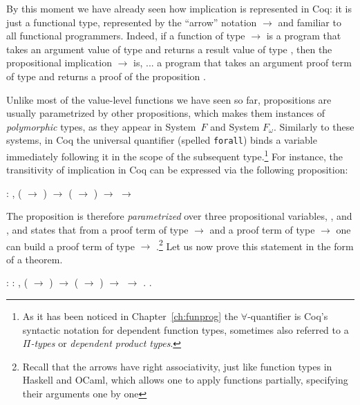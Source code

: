 By this moment we have already seen how implication is represented in
Coq: it is just a functional type, represented by the ``arrow'' notation
\ensuremath{\rightarrow} and familiar to all functional programmers. Indeed, if a function
of type  \ensuremath{\rightarrow}  is a program that takes an argument value of type 
and returns a result value of type , then the propositional
implication  \ensuremath{\rightarrow}  is, ... a program that takes an argument proof
term of type  and returns a proof of the proposition .


Unlike most of the value-level functions we have seen so far,
propositions are usually parametrized by other propositions, which
makes them instances of \textit{polymorphic} types, as they appear in
System~$F$ and System $F_{\omega}$. Similarly to these systems, in
Coq the universal quantifier \coqdockw{\ensuremath{\forall}} (spelled \texttt{forall}) binds a
variable immediately following it in the scope of the subsequent
type.\footnote{As it has been noticed in Chapter~\ref{ch:funprog} the
$\forall$-quantifier is Coq's syntactic notation for dependent
function types, sometimes also referred to a \emph{$\Pi$-types} or
\emph{dependent product types}.} For
instance, the transitivity of implication in Coq can be expressed via
the following proposition:


\begin{center}
\coqdockw{\ensuremath{\forall}}   : , ( \ensuremath{\rightarrow} ) \ensuremath{\rightarrow} ( \ensuremath{\rightarrow} ) \ensuremath{\rightarrow}  \ensuremath{\rightarrow} 
\end{center}


The proposition is therefore \textit{parametrized} over three propositional
variables, ,  and , and states that from a proof term of
type  \ensuremath{\rightarrow}  and a proof term of type  \ensuremath{\rightarrow}  one can build a
proof term of type  \ensuremath{\rightarrow} .\footnote{Recall that the arrows have
right associativity, just like function types in Haskell and OCaml,
which allows one to apply functions partially, specifying their
arguments one by one} Let us now prove this statement in the form of
a theorem.  \begin{coqdoccode}
\coqdocemptyline
\coqdocnoindent
{} : \coqdockw{\ensuremath{\forall}}   : , ( \ensuremath{\rightarrow} ) \ensuremath{\rightarrow} ( \ensuremath{\rightarrow} ) \ensuremath{\rightarrow}  \ensuremath{\rightarrow} .\coqdoceol
\coqdocnoindent
{}.\coqdoceol
\coqdocemptyline
\end{coqdoccode}


